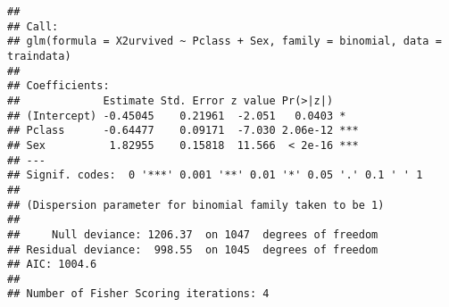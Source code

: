 \documentclass[
]{article}
\newenvironment{Shaded}{\begin{snugshade}}{\end{snugshade}}
\newcommand{\AttributeTok}[1]{\textcolor[rgb]{0.13,0.29,0.53}{#1}}
\newcommand{\DecValTok}[1]{\textcolor[rgb]{0.00,0.00,0.81}{#1}}
\newcommand{\FloatTok}[1]{\textcolor[rgb]{0.00,0.00,0.81}{#1}}
\newcommand{\FunctionTok}[1]{\textcolor[rgb]{0.13,0.29,0.53}{\textbf{#1}}}
\newcommand{\NormalTok}[1]{#1}
\newcommand{\OtherTok}[1]{\textcolor[rgb]{0.56,0.35,0.01}{#1}}
\newcommand{\SpecialCharTok}[1]{\textcolor[rgb]{0.81,0.36,0.00}{\textbf{#1}}}
\newcommand{\StringTok}[1]{\textcolor[rgb]{0.31,0.60,0.02}{#1}}
\begin{document}
\begin{verbatim}
## 
## Call:
## glm(formula = X2urvived ~ Pclass + Sex, family = binomial, data = traindata)
## 
## Coefficients:
##             Estimate Std. Error z value Pr(>|z|)    
## (Intercept) -0.45045    0.21961  -2.051   0.0403 *  
## Pclass      -0.64477    0.09171  -7.030 2.06e-12 ***
## Sex          1.82955    0.15818  11.566  < 2e-16 ***
## ---
## Signif. codes:  0 '***' 0.001 '**' 0.01 '*' 0.05 '.' 0.1 ' ' 1
## 
## (Dispersion parameter for binomial family taken to be 1)
## 
##     Null deviance: 1206.37  on 1047  degrees of freedom
## Residual deviance:  998.55  on 1045  degrees of freedom
## AIC: 1004.6
## 
## Number of Fisher Scoring iterations: 4
\end{verbatim}

\begin{Shaded}
\end{Shaded}
\end{document}
